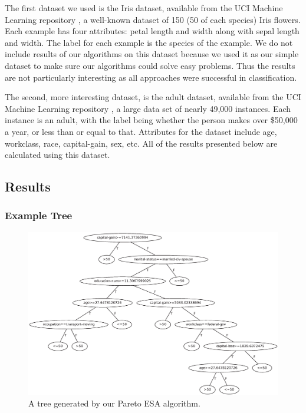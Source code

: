 \documentclass{acm_proc_article-sp}
\begin{document}
The first dataset we used is the Iris dataset, available from the UCI Machine Learning repository \cite{Bache+Lichman:2013}, a well-known dataset of 150 (50 of each species) Iris flowers. Each example has four attributes: petal length and width along with sepal length and width. The label for each example is the species of the example. We do not include results of our algorithms on this dataset because we used it as our simple dataset to make sure our algorithms could solve easy problems. Thus the results are not particularly interesting as all approaches were successful in classification.

The second, more interesting dataset, is the adult dataset, available from the UCI Machine Learning repository \cite{Bache+Lichman:2013}, a large data set of nearly 49,000 instances. Each instance is an adult, with the label being whether the person makes over \$50,000 a year, or less than or equal to that. Attributes for the dataset include age, workclass, race, capital-gain, sex, etc. All of the results presented below are calculated using this dataset.

\subsection{Results}

\subsubsection{Example Tree}

\begin{figure}[h]
\centering
\includegraphics[width=\linewidth]{tree.eps}
\caption{A tree generated by our Pareto ESA algorithm.}\label{tree}
\end{figure}
\end{document}
